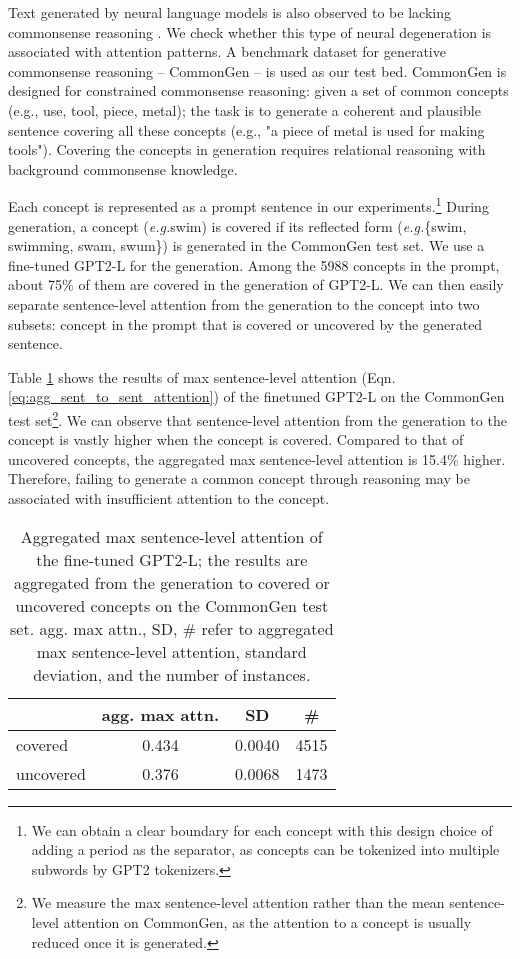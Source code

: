 \documentclass[11pt,a4paper]{article}
\newcommand{\eg}{\textit{e.g.}}
\begin{document}
Text generated by neural language models is also observed to be lacking commonsense reasoning \cite{mao2019improving}. We check whether this type of neural degeneration is associated with attention patterns. A benchmark dataset for generative commonsense reasoning -- CommonGen \citep{lin-etal-2020-commongen} -- is used as our test bed. CommonGen is designed for constrained commonsense reasoning: given a set of common concepts (e.g., {use, tool, piece, metal}); the task is to generate a coherent and plausible sentence covering all these concepts (e.g., "a piece of metal is used for making tools"). Covering the concepts in generation requires relational reasoning with background commonsense knowledge.

Each concept is represented as a prompt sentence in our experiments.\footnote{We can obtain a clear boundary for each concept with this design choice of adding a period as the separator, as concepts can be tokenized into multiple subwords by GPT2 tokenizers.} During generation, a concept (\eg swim) is covered if its reflected form (\eg \{swim, swimming, swam, swum\}) is generated in the CommonGen test set.  We use a fine-tuned GPT2-L for the generation. Among the 5988 concepts in the prompt, about 75\% of them are covered in the generation of GPT2-L. We can then easily separate sentence-level attention from the generation to the concept into two subsets: concept in the prompt that is covered or uncovered by the generated sentence. 

Table \ref{tab:commongen_analysis} shows the results of max sentence-level attention (Eqn. \ref{eq:agg_sent_to_sent_attention}) of the finetuned GPT2-L on the CommonGen test set\footnote{We measure the max sentence-level attention rather than the mean sentence-level attention on CommonGen, as the attention to a concept is usually reduced once it is generated.}. We can observe that sentence-level attention from the generation to the concept is vastly higher when the concept is covered. Compared to that of uncovered concepts, the aggregated max sentence-level attention is 15.4\% higher. Therefore, failing to generate a common concept through reasoning may be associated with insufficient attention to the concept.   
\begin{table}[t]
\begin{tabular}{l|ccc}
\toprule
            & agg. max attn. & SD     & \#   \\ \midrule
covered     & 0.434                    & 0.0040 & 4515 \\
uncovered & 0.376                    & 0.0068 & 1473 \\ \bottomrule
\end{tabular} 
\caption{Aggregated max sentence-level attention of the fine-tuned GPT2-L; the results are aggregated from the generation to covered or uncovered concepts on the CommonGen test set. agg. max attn., SD, \# refer to aggregated max sentence-level attention, standard deviation, and the number of instances. }\label{tab:commongen_analysis}
\end{table}
\end{document}
